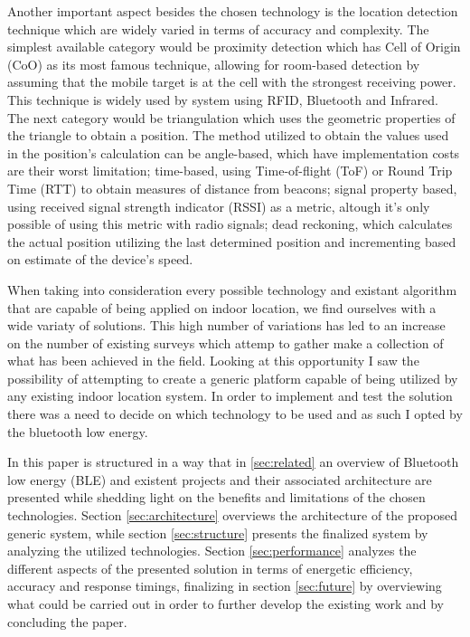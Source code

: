 \documentclass[a4paper]{IEEEtran}
\begin{document}
Another important aspect besides the chosen technology is the location detection technique which are widely varied in terms of accuracy and complexity. The simplest available category would be proximity detection which has Cell of Origin (CoO) as its most famous technique, allowing for room-based detection by assuming that the mobile target is at the cell with the strongest receiving power. This technique is widely used by system using RFID, Bluetooth and Infrared. The next category would be triangulation which uses the geometric properties of the triangle to obtain a position. The method utilized to obtain the values used in the position's calculation can be angle-based, which have implementation costs are their worst limitation; time-based, using Time-of-flight (ToF) or Round Trip Time (RTT) to obtain measures of distance from beacons; signal property based, using received signal strength indicator (RSSI) as a metric, altough it's only possible of using this metric with radio signals; dead reckoning, which calculates the actual position utilizing the last determined position and incrementing based on estimate of the device's speed.

When taking into consideration every possible technology and existant algorithm that are capable of being applied on indoor location, we find ourselves with a wide variaty of solutions. This high number of variations has led to an increase on the number of existing surveys which attemp to gather make a collection of what has been achieved in the field. Looking at this opportunity I saw the possibility of attempting to create a generic platform capable of being utilized by any existing indoor location system. In order to implement and test the solution there was a need to decide on which technology to be used and as such I opted by the bluetooth low energy.

In this paper is structured in a way that in \ref{sec:related} an overview of Bluetooth low energy (BLE) and existent projects and their associated architecture are presented while shedding light on the benefits and limitations of the chosen technologies. Section \ref{sec:architecture} overviews the architecture of the proposed generic system, while section \ref{sec:structure} presents the finalized system by analyzing the utilized technologies. Section \ref{sec:performance} analyzes the different aspects of the presented solution in terms of energetic efficiency, accuracy and response timings, finalizing in section \ref{sec:future} by overviewing what could be carried out in order to further develop the existing work and by concluding the paper.
\end{document}
